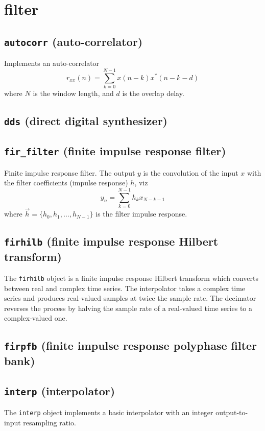 % 
%
\section{filter}
\label{module:filter}

\subsection{{\tt autocorr} (auto-correlator)}
Implements an auto-correlator
\[
    r_{xx}(n) = \sum_{k=0}^{N-1} {x(n-k)x^*(n-k-d)}
\]
where $N$ is the window length, and $d$ is the overlap delay.

\subsection{{\tt dds} (direct digital synthesizer)}

\subsection{{\tt fir\_filter} (finite impulse response filter)}
Finite impulse response filter.
The output $y$ is the convolution of the input $x$ with the filter
coefficients (impulse response) $h$, viz
\[
    y_n = \sum_{k=0}^{N-1}{ h_k x_{N-k-1} }
\]
where $\vec{h} = \{h_0,h_1,\ldots,h_{N-1}\}$ is the filter impulse response.

\subsection{{\tt firhilb} (finite impulse response Hilbert transform)}
The {\tt firhilb} object is a finite impulse response Hilbert transform which
converts between real and complex time series.
The interpolator takes a complex time series and produces real-valued samples
at twice the sample rate.
The decimator reverses the process by halving the sample rate of a real-valued
time series to a complex-valued one.



\subsection{{\tt firpfb} (finite impulse response polyphase filter bank)}

\subsection{{\tt interp} (interpolator)}
The {\tt interp} object implements a basic interpolator with an integer
output-to-input resampling ratio.

